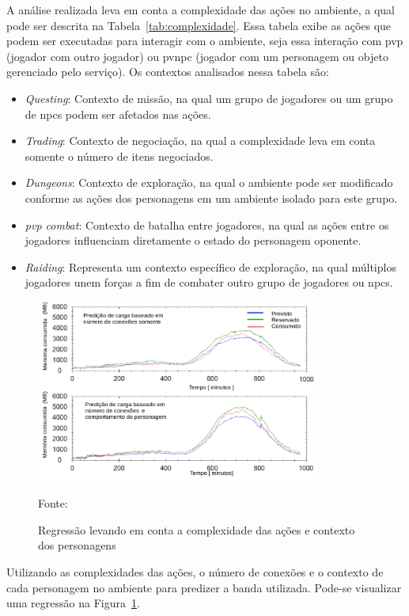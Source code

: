 A análise realizada leva em conta a complexidade das ações no ambiente, a qual pode ser descrita na Tabela~\ref{tab:complexidade}.
%
Essa tabela exibe as ações que podem ser executadas para interagir com o ambiente, seja essa interação com \ac{pvp} (jogador com outro jogador) ou \ac{pvnpc} (jogador com um personagem ou objeto gerenciado pelo serviço).
%
Os contextos analisados nessa tabela são:

\begin{itemize}
  \item \textit{Questing}: Contexto de missão, na qual um grupo de jogadores ou um grupo de \ac{npcs} podem ser afetados nas ações.
  \item \textit{Trading}: Contexto de negociação, na qual a complexidade leva em conta somente o número de itens negociados.
  \item \textit{Dungeons}: Contexto de exploração, na qual o ambiente pode ser modificado conforme as ações dos personagens em um ambiente isolado para este grupo.
  \item \textit{\ac{pvp} combat}: Contexto de batalha entre jogadores, na qual as ações entre os jogadores influenciam diretamente o estado do personagem oponente.
  \item \textit{Raiding}: Representa um contexto específico de exploração, na qual múltiplos jogadores unem forças a fim de combater outro grupo de jogadores ou \ac{npcs}.
\end{itemize}


\begin{figure}[htb!]
\caption{Regressão levando em conta a complexidade das ações e contexto dos personagens}
\label{fig:regressao_complexidade}
\includegraphics[height=6.0cm]{img/cap2/network_regressao_complexidade.png}
\centering

Fonte:~\cite{6374456}
\end{figure}


Utilizando as complexidades das ações, o número de conexões e o contexto de cada personagem no ambiente para predizer a banda utilizada.
%
Pode-se visualizar uma regressão na Figura~\ref{fig:regressao_complexidade}.



